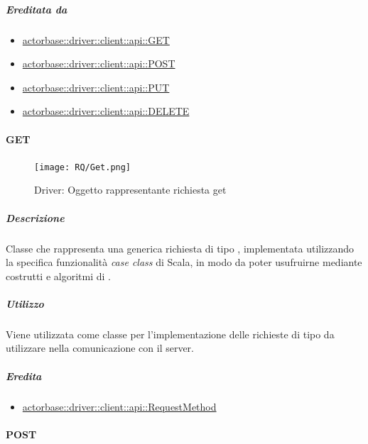 \documentclass{scalatekids-article}
\begin{document}
\subparagraph{Ereditata da}

\begin{itemize}
\item \hyperref[sec:actorbase::driver::client::api::GET]{actorbase::driver::client::api::GET}
\item \hyperref[sec:actorbase::driver::client::api::POST]{actorbase::driver::client::api::POST}
\item \hyperref[sec:actorbase::driver::client::api::PUT]{actorbase::driver::client::api::PUT}
\item \hyperref[sec:actorbase::driver::client::api::DELETE]{actorbase::driver::client::api::DELETE}
\end{itemize}


\paragraph{GET}
\label{sec:actorbase::driver::client::api::GET}

\begin{figure}[H]
  \begin{center}
    \texttt{[image: RQ/Get.png]}
    \caption{Driver: Oggetto rappresentante richiesta get}
  \end{center}
\end{figure}

\subparagraph{Descrizione}

Classe che rappresenta una generica richiesta  di tipo
, implementata utilizzando la specifica funzionalità \textit{case
  class} di Scala, in modo da poter usufruirne mediante costrutti e algoritmi di
.

\subparagraph{Utilizzo}

Viene utilizzata come classe per l'implementazione delle richieste 
di tipo  da utilizzare nella comunicazione con il server.

\subparagraph{Eredita}

\begin{itemize}
\item \hyperref[sec:actorbase::driver::client::api::RequestMethod]{actorbase::driver::client::api::RequestMethod}
\end{itemize}


\paragraph{POST}
\label{sec:actorbase::driver::client::api::POST}
\end{document}
